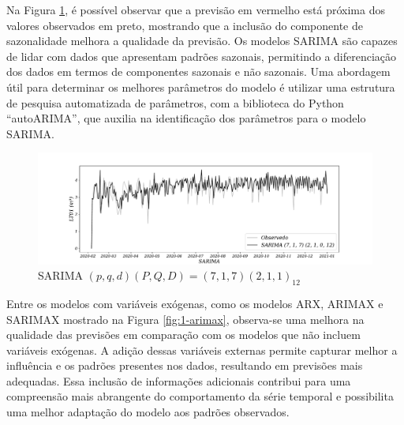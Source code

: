 Na Figura \ref{fig:1-sarima}, é possível observar que a previsão em vermelho está próxima dos valores observados em preto, mostrando que a inclusão do componente de sazonalidade melhora a qualidade da previsão. Os modelos SARIMA são capazes de lidar com dados que apresentam padrões sazonais, permitindo a diferenciação dos dados em termos de componentes sazonais e não sazonais. Uma abordagem útil para determinar os melhores parâmetros do modelo é utilizar uma estrutura de pesquisa automatizada de parâmetros, com a biblioteca do Python ``autoARIMA'', que auxilia na identificação dos parâmetros para o modelo SARIMA. 

\begin{figure}[H]
	\centering
	\caption{SARIMA $ (p,q,d)(P,Q,D)=(7,1,7) (2,1,1)_{12}$}
	\label{fig:1-sarima}
	\includegraphics[width=1\linewidth]{Modelos/Figuras/SARIMA}
	
	
\end{figure}

Entre os modelos com variáveis exógenas, como os modelos ARX, ARIMAX e SARIMAX mostrado na Figura \ref{fig:1-arimax}, observa-se uma melhora na qualidade das previsões em comparação com os modelos que não incluem variáveis exógenas. A adição dessas variáveis externas permite capturar melhor a influência e os padrões presentes nos dados, resultando em previsões mais adequadas. Essa inclusão de informações adicionais contribui para uma compreensão mais abrangente do comportamento da série temporal e possibilita uma melhor adaptação do modelo aos padrões observados.

